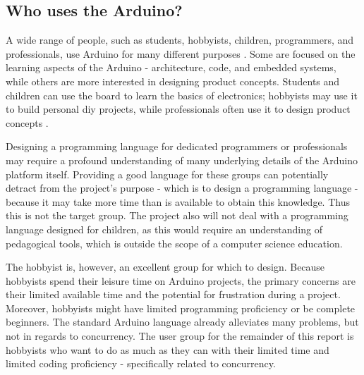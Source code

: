 \subsection{Who uses the Arduino?}\label{subsec:whouses}
A wide range of people, such as students, hobbyists, children, programmers, and professionals, use Arduino for many different purposes \cite{WhatArduino}. Some are focused on the learning aspects of the Arduino - architecture, code, and embedded systems, while others are more interested in designing product concepts. Students and children can use the board to learn the basics of electronics; hobbyists may use it to build personal \gls{diy} projects, while professionals often use it to design product concepts \cite{WhatArduino}.

Designing a programming language for dedicated programmers or professionals may require a profound understanding of many underlying details of the Arduino platform itself. Providing a good language for these groups can potentially detract from the project's purpose - which is to design a programming language - because it may take more time than is available to obtain this knowledge. Thus this is not the target group. The project also will not deal with a programming language designed for children, as this would require an understanding of pedagogical tools, which is outside the scope of a computer science education.

The hobbyist is, however, an excellent group for which to design. Because hobbyists spend their leisure time on Arduino projects, the primary concerns are their limited available time and the potential for frustration during a project. Moreover, hobbyists might have limited programming proficiency or be complete beginners. The standard Arduino language already alleviates many problems, but not in regards to concurrency. The user group for the remainder of this report is hobbyists who want to do as much as they can with their limited time and limited coding proficiency - specifically related to concurrency.